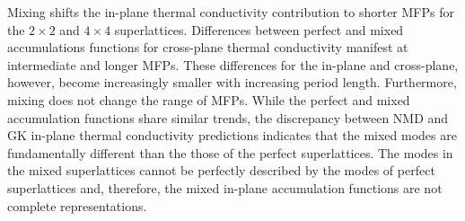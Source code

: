 \documentclass[aps,prb,preprint,preprintnumbers,amsmath,amssymb,floatfix,superscriptaddress]{revtex4}
\begin{document}
Mixing shifts the in-plane thermal conductivity contribution to shorter MFPs for the $2 \times 2 $ and $4 \times 4 $ superlattices. Differences between perfect and mixed accumulations functions for cross-plane thermal conductivity manifest at intermediate and longer MFPs. These differences for the in-plane and cross-plane, however, become increasingly smaller with increasing period length. Furthermore, mixing does not change the range of MFPs. While the perfect and mixed accumulation functions share similar trends, the discrepancy between NMD and GK in-plane thermal conductivity predictions indicates that the mixed modes are fundamentally different than the those of the perfect superlattices. The modes in the mixed superlattices cannot be perfectly described by the modes of perfect superlattices and, therefore, the mixed in-plane accumulation functions are not complete representations.



\end{document}
